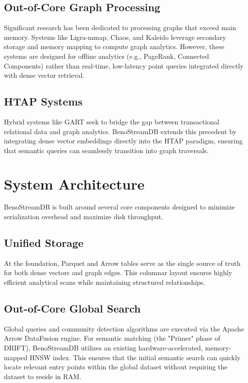 \documentclass[11pt,twocolumn]{article}
\begin{document}
\subsection{Out-of-Core Graph Processing}
Significant research has been dedicated to processing graphs that exceed main memory. Systems like Ligra-mmap, Chaos, and Kaleido leverage secondary storage and memory mapping to compute graph analytics. However, these systems are designed for offline analytics (e.g., PageRank, Connected Components) rather than real-time, low-latency point queries integrated directly with dense vector retrieval.

\subsection{HTAP Systems}
Hybrid systems like GART seek to bridge the gap between transactional relational data and graph analytics. BenoStreamDB extends this precedent by integrating dense vector embeddings directly into the HTAP paradigm, ensuring that semantic queries can seamlessly transition into graph traversals.

\section{System Architecture}

BenoStreamDB is built around several core components designed to minimize serialization overhead and maximize disk throughput.

\subsection{Unified Storage}
At the foundation, Parquet and Arrow tables serve as the single source of truth for both dense vectors and graph edges. This columnar layout ensures highly efficient analytical scans while maintaining structured relationships.

\subsection{Out-of-Core Global Search}
Global queries and community detection algorithms are executed via the Apache Arrow DataFusion engine. For semantic matching (the "Primer" phase of DRIFT), BenoStreamDB utilizes an existing hardware-accelerated, memory-mapped HNSW index. This ensures that the initial semantic search can quickly locate relevant entry points within the global dataset without requiring the dataset to reside in RAM.
\end{document}
